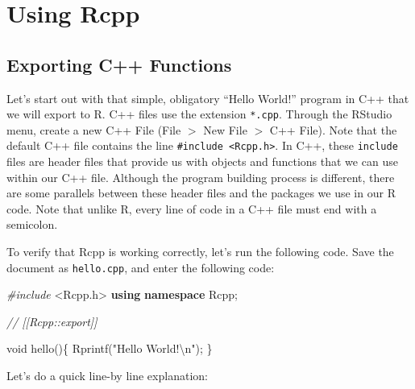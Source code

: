 \documentclass[
]{krantz}
\newenvironment{Shaded}{\begin{snugshade}}{\end{snugshade}}
\newcommand{\CommentTok}[1]{\textcolor[rgb]{0.56,0.35,0.01}{\textit{#1}}}
\newcommand{\DataTypeTok}[1]{\textcolor[rgb]{0.13,0.29,0.53}{#1}}
\newcommand{\ImportTok}[1]{#1}
\newcommand{\KeywordTok}[1]{\textcolor[rgb]{0.13,0.29,0.53}{\textbf{#1}}}
\newcommand{\NormalTok}[1]{#1}
\newcommand{\PreprocessorTok}[1]{\textcolor[rgb]{0.56,0.35,0.01}{\textit{#1}}}
\newcommand{\SpecialCharTok}[1]{\textcolor[rgb]{0.00,0.00,0.00}{#1}}
\newcommand{\StringTok}[1]{\textcolor[rgb]{0.31,0.60,0.02}{#1}}
\begin{document}
\hypertarget{using-rcpp}{%
\section{Using Rcpp}\label{using-rcpp}}

\hypertarget{exporting-c-functions}{%
\subsection{Exporting C++ Functions}\label{exporting-c-functions}}

Let's start out with that simple, obligatory ``Hello World!'' program in C++ that we will export to R. C++ files use the extension \texttt{*.cpp}. Through the RStudio menu, create a new C++ File (File \(>\) New File \(>\) C++ File). Note that the default C++ file contains the line \texttt{\#include\ \textless{}Rcpp.h\textgreater{}}. In C++, these \texttt{include} files are header files that provide us with objects and functions that we can use within our C++ file. Although the program building process is different, there are some parallels between these header files and the packages we use in our R code. Note that unlike R, every line of code in a C++ file must end with a semicolon.

To verify that Rcpp is working correctly, let's run the following code. Save the document as \texttt{hello.cpp}, and enter the following code:

\begin{Shaded}
\begin{Highlighting}[]
\PreprocessorTok{\#include }\ImportTok{\textless{}Rcpp.h\textgreater{}}
\KeywordTok{using} \KeywordTok{namespace}\NormalTok{ Rcpp;}

\CommentTok{// [[Rcpp::export]]}

\DataTypeTok{void}\NormalTok{ hello()\{}
\NormalTok{  Rprintf(}\StringTok{"Hello World!}\SpecialCharTok{\textbackslash{}n}\StringTok{"}\NormalTok{);}
\NormalTok{\}}
\end{Highlighting}
\end{Shaded}

Let's do a quick line-by line explanation:
\end{document}
